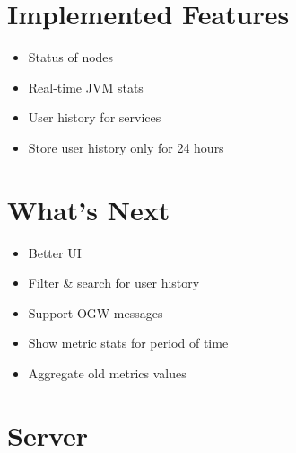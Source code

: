 \section*{Implemented Features}

\begin{itemize}
    \item Status of nodes
    \item Real-time JVM stats
    \item User history for  services
    \item Store user history only for 24 hours
\end{itemize}

\section*{What’s Next}

\begin{itemize}
    \item Better UI
    \item Filter & search for user history
    \item Support OGW messages
    \item Show metric stats for period of time
    \item Aggregate old metrics values
\end{itemize}

\section*{Server}

